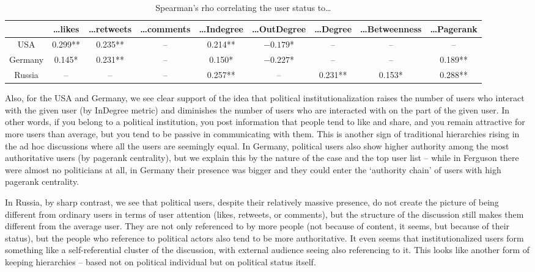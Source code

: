 \begin{table}[ht]%
	\centering
	\caption{Spearman’s rho correlating the user status to…}%
	\label{tab:userStatusRhoCorrelation}%
	\begin{adjustbox}{width=1\textwidth}
		\small
		\begin{tabular}{ c  c  c  c  c  c  c  c  c }%
			\toprule
			& …likes & …retweets & …comments & …Indegree & …OutDegree &…Degree & …Betweenness & …Pagerank \\
			\hline
			USA & 0.299** & 0.235** & -- & 0.214** & \(-0.179\)* & -- & -- & -- \\
			Germany & 0.145* & 0.231** & -- & 0.150* & \(-0.227\)* & -- & -- & 0.189** \\
			Russia & -- & -- & -- & 0.257** & -- & 0.231** & 0.153* & 0.288** \\
			\bottomrule
		\end{tabular}%
	\end{adjustbox}
\end{table}

Also, for the USA and Germany, we see clear support of the idea that political institutionalization raises the number of users who interact with the given user (by InDegree metric) and diminishes the number of users who are interacted with on the part of the given user. In other words, if you belong to a political institution, you post information that people tend to like and share, and you remain attractive for more users than average, but you tend to be passive in communicating with them. This is another sign of traditional hierarchies rising in the ad hoc discussions where all the users are seemingly equal. In Germany, political users also show higher authority among the most authoritative users (by pagerank centrality), but we explain this by the nature of the case and the top user list -- while in Ferguson there were almost no politicians at all, in Germany their presence was bigger and they could enter the ‘authority chain’ of users with high pagerank centrality.

In Russia, by sharp contrast, we see that political users, despite their relatively massive presence, do not create the picture of being different from ordinary users in terms of user attention (likes, retweets, or comments), but the structure of the discussion still makes them different from the average user. They are not only referenced to by more people (not because of content, it seems, but because of their status), but the people who reference to political actors also tend to be more authoritative. It even seems that institutionalized users form something like a self-referential cluster of the discussion, with external audience seeing also referencing to it. This looks like another form of keeping hierarchies – based not on political individual but on political status itself.

